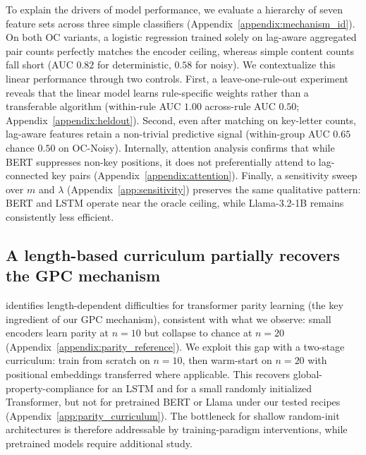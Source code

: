 \documentclass[fullpaper]{nldl}
\theoremstyle{plain}
\theoremstyle{definition}
\theoremstyle{remark}
\begin{document}
To explain the drivers of model performance, we evaluate a hierarchy of seven feature sets across three simple classifiers (Appendix~\ref{appendix:mechanism_id}). On both OC variants, a logistic regression trained solely on lag-aware aggregated pair counts perfectly matches the encoder ceiling, whereas simple content counts fall short (AUC $0.82$ for deterministic, $0.58$ for noisy). We contextualize this linear performance through two controls. First, a leave-one-rule-out experiment reveals that the linear model learns rule-specific weights rather than a transferable algorithm (within-rule AUC $1.00$ \vs across-rule AUC $0.50$; Appendix~\ref{appendix:heldout}). Second, even after matching on key-letter counts, lag-aware features retain a non-trivial predictive signal (within-group AUC $0.65$ \vs chance $0.50$ on OC-Noisy). Internally, attention analysis confirms that while BERT suppresses non-key positions, it does not preferentially attend to lag-connected key pairs (Appendix~\ref{appendix:attention}). Finally, a sensitivity sweep over $m$ and $\lambda$ (Appendix~\ref{app:sensitivity}) preserves the same qualitative pattern: BERT and LSTM operate near the oracle ceiling, while Llama-3.2-1B remains consistently less efficient.

\subsection{A length-based curriculum partially recovers the GPC mechanism}
\label{sec:curriculum}
\citet{hahn-2020-theoretical} identifies length-dependent difficulties for transformer parity learning (the key ingredient of our GPC mechanism), consistent with what we observe: small encoders learn parity at $n=10$ but collapse to chance at $n=20$ (Appendix~\ref{appendix:parity_reference}). We exploit this gap with a two-stage curriculum: train from scratch on $n=10$, then warm-start on $n=20$ with positional embeddings transferred where applicable. This recovers global-property-compliance for an LSTM and for a small randomly initialized Transformer, but not for pretrained BERT or Llama under our tested recipes (Appendix~\ref{app:parity_curriculum}). The bottleneck for shallow random-init architectures is therefore addressable by training-paradigm interventions, while pretrained models require additional study.
\end{document}
